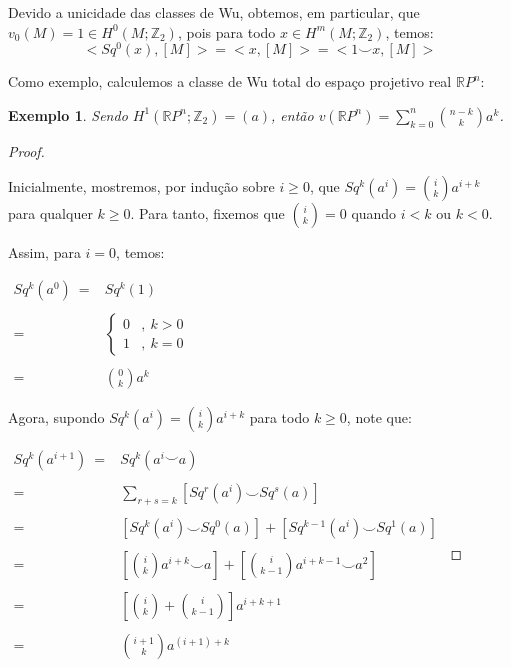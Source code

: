 \documentclass[12pt,oneside]{book} %
\newtheorem{ex}     {\hspace{0.5cm}Exemplo}[chapter]
\newcommand{\ds}{\displaystyle}
\newcommand{\RP}{\mathbb{R}P}
\newcommand{\Z}{\mathbb{Z}}
\newcommand{\ccup}{\smile}
\begin{document}
\par Devido a unicidade das classes de Wu, obtemos, em particular, que $v_{0}(M)=1\in H^{0}(M;\Z_{2})$, pois para todo $x\in H^{m}(M;\Z_{2})$, temos:
$$ <Sq^{0}(x),[M]>=<x,[M]>=<1\ccup x,[M]> $$

\par Como exemplo, calculemos a classe de Wu total do espaço projetivo real $\RP^{n}$:

\begin{ex}\label{wu_rpn}
	Sendo $H^{1}(\RP^{n};\Z_{2})=(a)$, então $v(\RP^{n})=\ds\sum_{k=0}^{n}\binom{n-k}{k} a^{k}$.
\end{ex}
\begin{proof}
	
	\
	
	Inicialmente, mostremos, por indução sobre $i\geq 0$, que $Sq^{k}(a^{i})=\binom{i}{k}a^{i+k}$ para qualquer $k\geq 0$. Para tanto, fixemos que $\binom{i}{k}=0$ quando $i<k$ ou $k<0$.
	
	\par Assim, para $i=0$, temos: \newline 
	
	$\begin{array}{rl}
		Sq^{k}(a^{0}) \ = & Sq^{k}(1) \\
		& \\
		= & \left\{ \begin{array}{cl}
			0 & , \ k>0 \\
			1 & , \ k=0
		\end{array} \right. \\
		& \\
		= & \binom{0}{k}a^{k}
	\end{array}$ \newline 
	
	\par Agora, supondo $Sq^{k}(a^{i})=\binom{i}{k}a^{i+k}$ para todo $k\geq 0$, note que: \newline 
	
	$\begin{array}{rl}
		Sq^{k}(a^{i+1}) \ = & Sq^{k}(a^{i}\ccup a) \\
		& \\
		= & \ds\sum_{r+s=k}\left[ Sq^{r}(a^{i})\ccup Sq^{s}(a)\right] \\
		& \\
		= & \left[ Sq^{k}(a^{i})\ccup Sq^{0}(a)\right]+\left[ Sq^{k-1}(a^{i})\ccup Sq^{1}(a)\right] \\
		& \\
		= & \left[ \binom{i}{k}a^{i+k}\ccup a\right]+\left[ \binom{i}{k-1}a^{i+k-1}\ccup a^{2}\right] \\
		& \\
		= & \left[ \binom{i}{k}+\binom{i}{k-1}\right]a^{i+k+1} \\
		& \\
		= & \binom{i+1}{k}a^{(i+1)+k}
	\end{array}$ \newline 
	

\end{proof}
\end{document}
